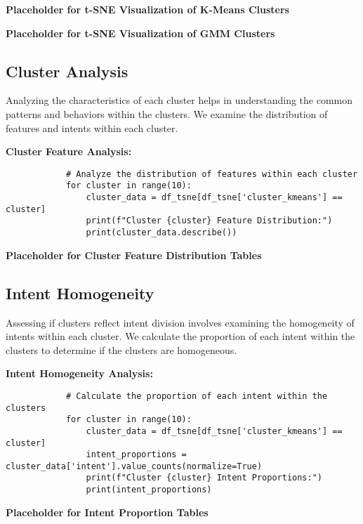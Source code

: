         \textbf{Placeholder for t-SNE Visualization of K-Means Clusters}

        \textbf{Placeholder for t-SNE Visualization of GMM Clusters}
            
    \subsection{Cluster Analysis}
    
        Analyzing the characteristics of each cluster helps in understanding the common patterns and behaviors within the clusters. We examine the distribution of features and intents within each cluster.

        \textbf{Cluster Feature Analysis:}

        \begin{verbatim}
            # Analyze the distribution of features within each cluster
            for cluster in range(10):
                cluster_data = df_tsne[df_tsne['cluster_kmeans'] == cluster]
                print(f"Cluster {cluster} Feature Distribution:")
                print(cluster_data.describe())
        \end{verbatim}

        \textbf{Placeholder for Cluster Feature Distribution Tables}
            
    \subsection{Intent Homogeneity}
    
        Assessing if clusters reflect intent division involves examining the homogeneity of intents within each cluster. We calculate the proportion of each intent within the clusters to determine if the clusters are homogeneous.

        \textbf{Intent Homogeneity Analysis:}

        \begin{verbatim}
            # Calculate the proportion of each intent within the clusters
            for cluster in range(10):
                cluster_data = df_tsne[df_tsne['cluster_kmeans'] == cluster]
                intent_proportions = cluster_data['intent'].value_counts(normalize=True)
                print(f"Cluster {cluster} Intent Proportions:")
                print(intent_proportions)
        \end{verbatim}

        \textbf{Placeholder for Intent Proportion Tables}
        
